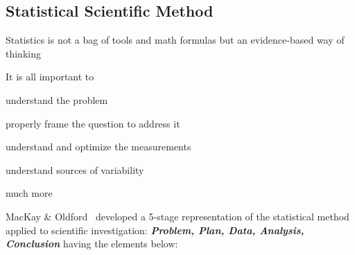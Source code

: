 \subsection{Statistical Scientific Method}
\bi
\item Statistics is not a bag of tools and math formulas but an
  evidence-based way of thinking 
\item It is all important to
  \bi
   \item understand the problem
   \item properly frame the question to address it
   \item understand and optimize the measurements
   \item understand sources of variability
   \item much more
     \ei
\item MacKay \& Oldford~\cite{mac00sci} developed a 5-stage
  representation of the statistical method applied to scientific
  investigation: \textbf{\emph{Problem, Plan, Data, Analysis, Conclusion}} having the elements below:
  \ei

